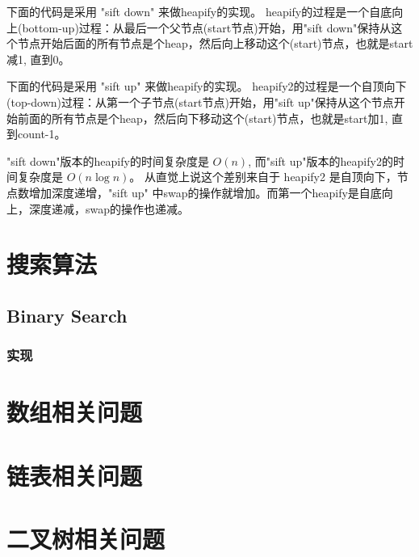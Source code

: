 \documentclass[UTF8]{report}
\begin{document}
下面的代码是采用 "sift down" 来做heapify的实现。 heapify的过程是一个自底向上(bottom-up)过程：从最后一个父节点(start节点)开始，用"sift down"保持从这个节点开始后面的所有节点是个heap，然后向上移动这个(start)节点，也就是start减1, 直到0。

 

下面的代码是采用 "sift up" 来做heapify的实现。 heapify2的过程是一个自顶向下(top-down)过程：从第一个子节点(start节点)开始，用"sift up"保持从这个节点开始前面的所有节点是个heap，然后向下移动这个(start)节点，也就是start加1, 直到count-1。



"sift down"版本的heapify的时间复杂度是 \(O(n)\), 而"sift up"版本的heapify2的时间复杂度是 \(O(n\log{n})\)。 从直觉上说这个差别来自于 heapify2 是自顶向下，节点数增加深度递增，"sift up" 中swap的操作就增加。而第一个heapify是自底向上，深度递减，swap的操作也递减。

\chapter{搜索算法}


\section{Binary Search}

\subsection{实现}

 
 



\chapter{数组相关问题}

\chapter{链表相关问题}

\chapter{二叉树相关问题}

\end{document}
